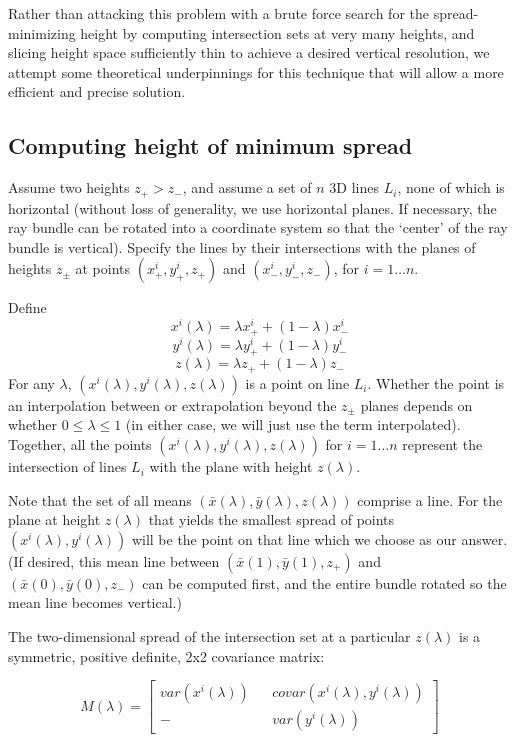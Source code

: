 \documentclass[10pt]{amsart}
\begin{document}
Rather than attacking this problem with a brute force search for the
spread-minimizing height by computing intersection sets at very many heights,
and slicing height space sufficiently thin to achieve a desired vertical
resolution, we attempt some theoretical underpinnings for this technique that
will allow a more efficient and precise solution.

\subsection{Computing height of minimum spread\label{poly}}
Assume two heights $z_{+} > z_{-}$, and assume a set of $n$ 3D lines $L_i$, none
of which is horizontal (without loss of generality, we use horizontal planes. If
necessary, the ray bundle can be rotated into a coordinate system so that the
`center' of the ray bundle is vertical). Specify the lines by their
intersections with the planes of heights $z_\pm$ at points
$(x_{+}^{i},y_{+}^{i}, z_+)$ and $(x_{-}^{i},y_{-}^{i}, z_-)$, for $i=1\ldots
n$.

Define
$$x^i(\lambda) = \lambda x^i_+ + (1-\lambda) x^i_-$$
$$y^i(\lambda) = \lambda y^i_+ + (1-\lambda) y^i_-$$
$$z(\lambda) = \lambda z_+ + (1-\lambda) z_-$$ For any $\lambda$,
$(x^i(\lambda), y^i(\lambda), z(\lambda))$ is a point on line $L_i$. Whether the
point is an interpolation between or extrapolation beyond the $z_\pm$ planes
depends on whether $0\le\lambda\le 1$ (in either case, we will just use the term
interpolated). Together, all the points $(x^i(\lambda), y^i(\lambda),
z(\lambda))$ for $i=1\ldots n$ represent the intersection of lines $L_i$ with
the plane with height $z(\lambda)$.

Note that the set of all means $(\bar{x}(\lambda),\bar{y}(\lambda),z(\lambda))$
comprise a line. For the plane at height $z(\lambda)$ that yields the smallest
spread of points $(x^i(\lambda),y^i(\lambda))$ will be the point on that line
which we choose as our answer. (If desired, this mean line between $(\bar{x}(1),
\bar{y}(1),z_+)$ and $(\bar{x}(0),\bar{y}(0),z_-)$ can be computed first, and
the entire bundle rotated so the mean line becomes vertical.)

The two-dimensional spread of the intersection set at a particular $z(\lambda)$
is a symmetric, positive definite, 2x2 covariance matrix:

\[M(\lambda) =
\begin{bmatrix}
 var(x^i(\lambda)) && covar(x^i(\lambda),y^i(\lambda)) \\
  -                && var(y^i(\lambda))
\end{bmatrix}
\]
\end{document}
